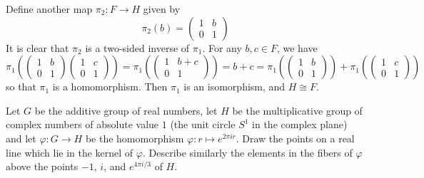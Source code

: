 \begin{solalph}
    Define another map $\pi_2 : F \to H$ given by
    \[\pi_2(b) = 
    \begin{pmatrix}
        1 & b \\
        0 & 1
    \end{pmatrix}\]
    It is clear that $\pi_2$ is a two-sided inverse of $\pi_1$. For any $b, c \in F$, we have
    \[\pi_1\left(
    \begin{pmatrix}
        1 & b \\
        0 & 1
    \end{pmatrix}
    \begin{pmatrix}
        1 & c \\
        0 & 1
    \end{pmatrix}\right) = 
    \pi_1\left(
    \begin{pmatrix}
        1 & b + c \\
        0 & 1
    \end{pmatrix}\right) = b + c = 
    \pi_1\left(
    \begin{pmatrix}
        1 & b \\
        0 & 1
    \end{pmatrix}\right) + 
    \pi_1\left(
    \begin{pmatrix}
        1 & c \\
        0 & 1
    \end{pmatrix}\right)\]
    so that $\pi_1$ is a homomorphism. Then $\pi_1$ is an isomorphism, and $H \cong F$.
\end{solalph}

\begin{exercise}\label{ex3.1.12}
    Let $G$ be the additive group of real numbers, let $H$ be the multiplicative group of complex numbers of absolute value $1$ (the unit circle $S^1$ in the complex plane) and let $\varphi : G \to H$ be the homomorphism $\varphi : r \mapsto e^{2\pi i r}$. Draw the points on a real line which lie in the kernel of $\varphi$. Describe similarly the elements in the fibers of $\varphi$ above the points $-1$, $i$, and $e^{4\pi i/3}$ of $H$.
\end{exercise}

